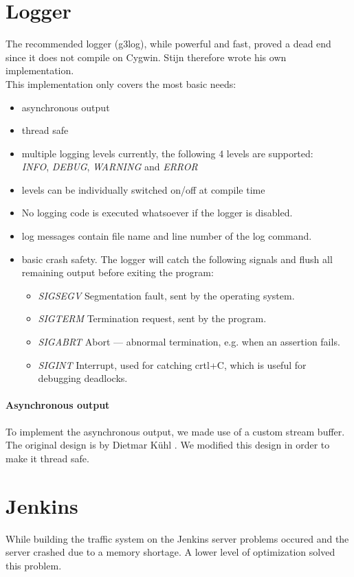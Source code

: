 \documentclass[8pt,a4paper]{report}
\begin{document}
\section{Logger}
The recommended logger (g3log), while powerful and fast, proved a dead end since it does not compile on Cygwin. 
Stijn therefore wrote his own implementation.\\
This implementation only covers the most basic needs:
\begin{itemize}
	\item asynchronous output
	\item thread safe
	\item multiple logging levels currently, the following 4 levels are supported:\\
		\emph{INFO}, \emph{DEBUG}, \emph{WARNING} and \emph{ERROR}
	\item levels can be individually switched on/off at compile time
	\item No logging code is executed whatsoever if the logger is disabled.
	\item log messages contain file name and line number of the log command.
	\item basic crash safety. The logger will catch the following signals and flush all remaining output before exiting the program:
		\begin{itemize}
			\item \emph{SIGSEGV} Segmentation fault, sent by the operating system.
			\item \emph{SIGTERM} Termination request, sent by the program.
			\item \emph{SIGABRT} Abort --- abnormal termination, e.g. when an assertion fails.
			\item \emph{SIGINT} Interrupt, used for catching crtl+C, which is useful for debugging deadlocks.
		\end{itemize}
\end{itemize}

\paragraph{Asynchronous output}
To implement the asynchronous output, we made use of a custom stream buffer. The original design is by Dietmar K{\"u}hl \cite{asynchwrite}. We modified this design in order to make it thread safe.

\section{Jenkins}
While building the traffic system on the Jenkins server problems occured and the server crashed due to a memory shortage. A lower level of optimization solved this problem.
\end{document}
